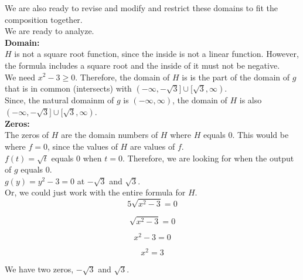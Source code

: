 \documentclass{ximera}
\begin{document}
We are also ready to revise and modify and restrict these domains to fit the composition together. \\





We are ready to analyze. \\




\textbf{\textcolor{blue!55!black}{Domain:}} \\


$H$ is not a square root function, since the inside is not a linear function.  However, the formula includes a square root and the inside of it must not be negative. \\

We need $x^2-3 \geq 0$.  Therefore, the domain of $H$ is is the part of the domain of $g$ that is in common (intersects) with $(-\infty, -\sqrt{3} ] \cup [ \sqrt{3}, \infty)$. \\

Since, the natural domainm of $g$ is $(-\infty, \infty)$, the domain of $H$ is also $(-\infty, -\sqrt{3} ] \cup [ \sqrt{3}, \infty)$. \\



\textbf{\textcolor{blue!55!black}{Zeros:}} \\


The zeros of $H$ are the domain numbers of $H$ where $H$ equals $0$.  This would be where $f = 0$, since the values of $H$ are values of $f$. \\



$f(t) = \sqrt{t}$ equals $0$ when $t = 0$. Therefore, we are looking for when the output of $g$ equals $0$. \\



$g(y) = y^2 - 3 = 0$ at $-\sqrt{3}$ and $\sqrt{3}$. \\



Or, we could just work with the entire formula for $H$. \\


\[
5 \sqrt{x^2-3} = 0
\]


\[
\sqrt{x^2-3} = 0
\]


\[
x^2-3 = 0
\]

\[
x^2 = 3
\]


We have two zeros, $-\sqrt{3}$ and $\sqrt{3}$. \\
\end{document}

